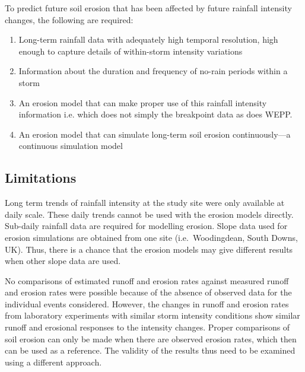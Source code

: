 To predict future soil erosion that has been affected by future rainfall
intensity changes, the following are required:
\begin{enumerate}
 \item Long-term rainfall data with adequately high temporal resolution, high
enough to capture details of within-storm intensity variations
 \item Information about the duration and frequency of no-rain periods within a
storm
 \item An erosion model that can make proper use of this rainfall intensity
information i.e. which does not simply the breakpoint data as does WEPP.
 \item An erosion model that can simulate long-term soil erosion
continuously---a continuous simulation model %
\end{enumerate}

\subsection{Limitations}
\label{sec:LimitationsStage2}
Long term trends of rainfall intensity at the study site were only available at
daily scale. These daily trends cannot be used with the erosion models directly.
Sub-daily rainfall data are required for modelling erosion.
Slope data used for erosion simulations are obtained from one site (i.e.\
Woodingdean, South Downs, UK). Thus, there is a chance that the erosion models
may give different results when other slope data are used.

No comparisons of estimated runoff and erosion rates against measured runoff and
erosion rates were possible because of the absence of observed data for the
individual events considered. However, the changes in runoff and erosion rates
from laboratory experiments with similar storm intensity conditions show similar
runoff and erosional responses to the intensity changes. Proper comparisons of
soil erosion can only be made when there are observed erosion rates, which then
can be used as a reference. The validity of the results thus need to be examined
using a different approach.

